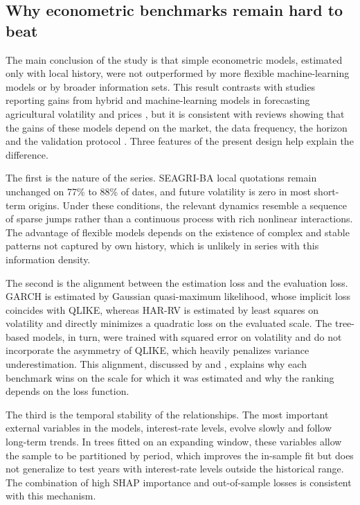 \documentclass[a4paper,fleqn]{cas-sc}
\begin{document}
\subsection{Why econometric benchmarks remain hard to beat}
\label{subsec:disc_benchmarks}

The main conclusion of the study is that simple econometric models, estimated only with local history, were not outperformed by more flexible machine-learning models or by broader information sets. This result contrasts with studies reporting gains from hybrid and machine-learning models in forecasting agricultural volatility and prices \citep{Manogna2025HybridVolatility,Zhang2025ClimateRealizedVolatility,Jin2024CoffeePriceML}, but it is consistent with reviews showing that the gains of these models depend on the market, the data frequency, the horizon and the validation protocol \citep{Guindani2024AgriculturalForecasting}. Three features of the present design help explain the difference.

The first is the nature of the series. SEAGRI-BA local quotations remain unchanged on 77\% to 88\% of dates, and future volatility is zero in most short-term origins. Under these conditions, the relevant dynamics resemble a sequence of sparse jumps rather than a continuous process with rich nonlinear interactions. The advantage of flexible models depends on the existence of complex and stable patterns not captured by own history, which is unlikely in series with this information density.

The second is the alignment between the estimation loss and the evaluation loss. GARCH is estimated by Gaussian quasi-maximum likelihood, whose implicit loss coincides with QLIKE, whereas HAR-RV is estimated by least squares on volatility and directly minimizes a quadratic loss on the evaluated scale. The tree-based models, in turn, were trained with squared error on volatility and do not incorporate the asymmetry of QLIKE, which heavily penalizes variance underestimation. This alignment, discussed by \citet{Patton2011VolatilityProxy} and \citet{HansenLunde2006ConsistentRanking}, explains why each benchmark wins on the scale for which it was estimated and why the ranking depends on the loss function.

The third is the temporal stability of the relationships. The most important external variables in the models, interest-rate levels, evolve slowly and follow long-term trends. In trees fitted on an expanding window, these variables allow the sample to be partitioned by period, which improves the in-sample fit but does not generalize to test years with interest-rate levels outside the historical range. The combination of high SHAP importance and out-of-sample losses is consistent with this mechanism.
\end{document}
